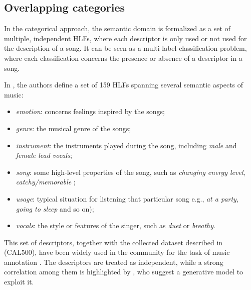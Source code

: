 \subsection{Overlapping categories}\label{sec:HLFs:anns}
In the categorical approach, the semantic domain is formalized as a set of multiple, independent HLFs, where each descriptor is only used or not used for the description of a song. It can be seen as a multi-label classification problem, where each classification concerns the presence or absence of a descriptor in a song. %

In \cite{wordsCAL500}, the authors define a set of 159 HLFs spanning several semantic aspects of music:
\begin{itemize}
\item \textit{emotion}: concerns feelings inspired by the songs; 
\item \textit{genre}: the musical genre of the songs;
\item \textit{instrument}: the instruments played during the song, including \textit{male} and \textit{female lead vocals};
\item \textit{song}: some high-level properties of the song, such as \textit{changing energy level}, \textit{catchy/memorable} ; 
\item \textit{usage}: typical situation for listening that particular song e.g., \textit{at a party}, \textit{going to sleep} and so on);  
\item \textit{vocals}: the style or features of the singer, such as \textit{duet} or \textit{breathy}.
\end{itemize}
This set of descriptors, together with the collected dataset described in \cite{Turnbull2007} (CAL500), have been widely used in the community for the task of music annotation \cite{coviello2011, nam2012learning,yeh2014improving}. The descriptors are treated as independent, while a strong correlation among them is highlighted by \cite{Miotto2012}, who suggest a generative model to exploit it.

